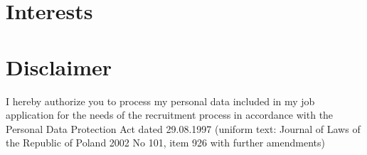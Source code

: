 \documentclass[11pt,a4paper,sans]{moderncv}
\begin{document}
\section{Interests}


\section{Disclaimer}

I hereby authorize you to process my personal data included in my job application for
the needs of the recruitment process in accordance with the Personal Data
Protection Act dated 29.08.1997 (uniform text: Journal of Laws of the Republic of
Poland 2002 No 101, item 926 with further amendments)



\end{document}
